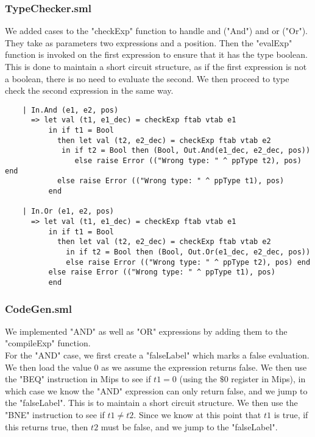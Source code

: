 \documentclass[12pt]{article}
\begin{document}
\subsubsection{TypeChecker.sml}
We added cases to the "checkExp" function to handle and ("And") and or ("Or"). They take as parameters two expressions and a position. Then the "evalExp" function is invoked on the first expression to ensure that it has the type boolean. This is done to maintain a short circuit structure, as if the first expression is not a boolean, there is no need to evaluate the second. We then proceed to type check the second expression in the same way. 
\begin{verbatim}
    | In.And (e1, e2, pos)
      => let val (t1, e1_dec) = checkExp ftab vtab e1
          in if t1 = Bool
            then let val (t2, e2_dec) = checkExp ftab vtab e2
             in if t2 = Bool then (Bool, Out.And(e1_dec, e2_dec, pos))
                else raise Error (("Wrong type: " ^ ppType t2), pos) end
            else raise Error (("Wrong type: " ^ ppType t1), pos)
          end

    | In.Or (e1, e2, pos)
      => let val (t1, e1_dec) = checkExp ftab vtab e1
          in if t1 = Bool
            then let val (t2, e2_dec) = checkExp ftab vtab e2
              in if t2 = Bool then (Bool, Out.Or(e1_dec, e2_dec, pos))
              else raise Error (("Wrong type: " ^ ppType t2), pos) end
          else raise Error (("Wrong type: " ^ ppType t1), pos)
          end
\end{verbatim}
\subsubsection{CodeGen.sml}
We implemented "AND" as well as "OR" expressions by adding them to the "compileExp" function.\\

For the "AND" case, we first create a "falseLabel" which marks a false evaluation. We then load the value 0 as we assume the expression returns false. We then use the "BEQ" instruction in Mips to see if \(t1 = 0\) (using the \(\$0\) register in Mips), in which case we know the "AND" expression can only return false, and we jump to the "falseLabel". This is to maintain a short circuit structure. We then use the "BNE" instruction to see if \(t1\neq t2\). Since we know at this point that \(t1\) is true, if this returns true, then \(t2\) must be false, and we jump to the "falseLabel". \\
\end{document}
